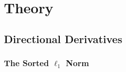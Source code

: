
\section{Theory}\label{sec:theory}
\subsection{Directional Derivatives}%
\label{sec:directional-derivatives}

\subsubsection{The Sorted \texorpdfstring{\(\ell_1\)}{l1}
  Norm}

